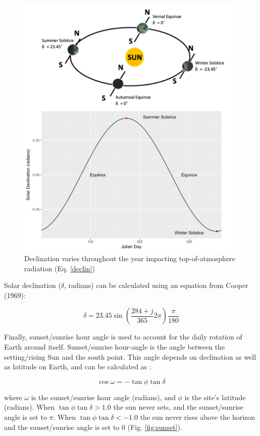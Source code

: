\documentclass[a4paper, 12pt] {report}
\begin{document}
\begin{figure}
  \includegraphics[width=0.75\linewidth]{Figures/Solar_Declination.png}
  \caption{Declination varies throughout the year impacting top-of-atmosphere radiation (Eq. \ref{declin})}
  \label{fig:decl}
\end{figure}

Solar declination ($\delta$, radians) can be calculated using an equation from Cooper (1969):

\begin{equation}\label{declin}
\delta = 23.45\sin{(\frac{284 + j}{365}2\pi)}\frac{\pi}{180}
\end{equation}

Finally, sunset/sunrise hour angle is used to account for the daily rotation of Earth around itself. Sunset/sunrise hour-angle is the angle between the setting/rising Sun and the south point. This angle depends on declination as well as latitude on Earth, and can be calculated as \cite{brockCalculatingSolarRadiation1981} :

\begin{equation}\label{hourangle}
\cos{\omega} = -\tan{\phi}\tan{\delta}
\end{equation}

where $\omega$ is the sunset/sunrise hour angle (radians), and $\phi$ is the site's latitude (radians). When $\tan{\phi}\tan{\delta} > 1.0$ the sun never sets, and the sunset/sunrise angle is set to $\pi$. When $\tan{\phi}\tan{\delta} < -1.0$ the sun never rises above the horizon and the sunset/sunrise angle is set to 0 \cite{keithPrinciplesSolarEngineering1978} (Fig. \ref{fig:sunset}).
\end{document}
